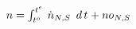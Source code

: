 \documentclass[border=1pt]{standalone}
\begin{document}
$n=\int_{ {{t^o}}{_{}} }^{ {{t^e}}{_{}} } \, {{\dot{n}}}{_{N, S}} \enskip d\,{t}{_{}}  + {no}{_{N, S}}$
\end{document}
